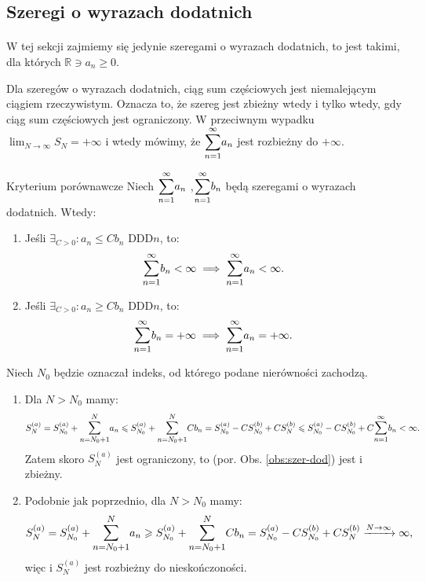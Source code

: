\documentclass{article}
\numberwithin{defi}{section}
\numberwithin{defi}{section}
\newcommand{\R}{\mathbb{R}}
\newcommand{\oo}{\infty}
\newcommand{\bsum}[2]{\mathlarger{\sum_{#1}^{#2}}}
\newcommand{\szerI}[1]{\bsum{n=1}{\oo} #1_n}
\newcommand{\gras}[2]{\lim_{#1 \to \oo} #2_{#1}}
\begin{document}
\subsection{Szeregi o wyrazach dodatnich}

\paragraph{} W tej sekcji zajmiemy się jedynie szeregami o wyrazach dodatnich, to jest takimi, dla których $\R \ni a_n \geqslant 0$. 
\begin{obs}{} \label{obs:szer-dod}
    Dla szeregów o wyrazach dodatnich, ciąg sum częściowych jest niemalejącym ciągiem rzeczywistym. Oznacza to, że szereg jest zbieżny wtedy i tylko wtedy, gdy ciąg sum częściowych jest ograniczony. W przeciwnym wypadku $\gras{N}{S} = + \oo$ i wtedy mówimy, że $\szerI{a}$ jest rozbieżny do $+\oo$. 
\end{obs}

\begin{twier}{Kryterium porównawcze} \label{twier:kryt-por}
    Niech $\szerI{a}$ ,$\szerI{b}$ będą szeregami o wyrazach dodatnich. Wtedy: \begin{enumerate}
        \item Jeśli $\exists_{C > 0}: a_n \leqslant C b_n$ DDD$n$, to: \begin{equation}
            \szerI{b} < \oo \implies \szerI{a} < \oo.
        \end{equation}
        \item Jeśli $\exists_{C > 0}: a_n \geqslant C b_n$ DDD$n$, to: \begin{equation}
            \szerI{b} = +\oo \implies \szerI{a} = +\oo.
        \end{equation}
    \end{enumerate}
\end{twier}

\begin{dow}
    Niech $N_0$ będzie oznaczał indeks, od którego podane nierówności zachodzą.
    \begin{enumerate}
        \item Dla $N > N_0$ mamy: \begin{equation*}
            S_N^{(a)} = S_{N_0}^{(a)} + \bsum{n = N_0 +1}{N}a_n \leqslant S_{N_0}^{(a)} + \bsum{n = N_0 +1}{N}C b_n = S_{N_0}^{(a)} - C S_{N_0}^{(b)} + C S_N^{(b)} \leqslant S_{N_0}^{(a)} - C S_{N_0}^{(b)} + C \szerI{b} < \oo. 
        \end{equation*} Zatem skoro $S_N^{(a)}$ jest ograniczony, to (por. Obs. \ref{obs:szer-dod}) jest i zbieżny.
        \item Podobnie jak poprzednio, dla $N > N_0$ mamy: \begin{equation*}
            S_N^{(a)} = S_{N_0}^{(a)} + \bsum{n = N_0 +1}{N}a_n \geqslant S_{N_0}^{(a)} + \bsum{n = N_0 +1}{N}C b_n = S_{N_0}^{(a)} - C S_{N_0}^{(b)} + C S_N^{(b)} \xrightarrow[]{N \to \oo} \oo,
        \end{equation*} więc i $S_N^{(a)}$ jest rozbieżny do nieskończoności.
    \end{enumerate}
\end{dow}
\end{document}
